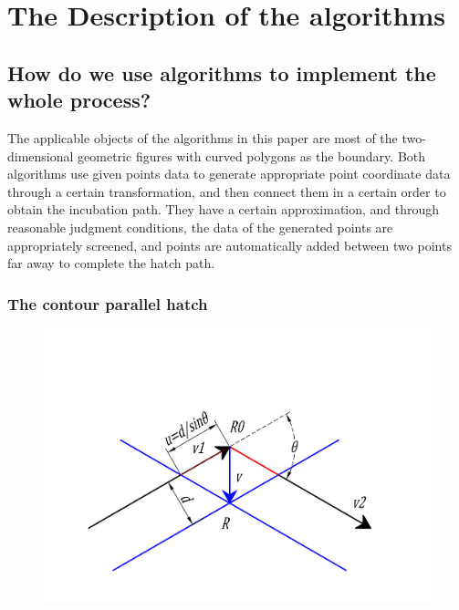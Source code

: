 \documentclass{apmcmthesis}
\begin{document}
\section{The Description of the algorithms}


\subsection{How do we use algorithms to implement the whole process?}

The applicable objects of the algorithms in this paper are most of the two-dimensional geometric figures with curved polygons as the boundary. Both algorithms use given points data to generate appropriate point coordinate data through a certain transformation, and then connect them in a certain order to obtain the incubation path. They have a certain approximation, and through reasonable judgment conditions, the data of the generated points are appropriately screened, and points are automatically added between two points far away to complete the hatch path.



\subsubsection{The contour parallel hatch}

\begin{figure}[!ht]
    \centering
    \includegraphics[width=12cm]{v}
    \caption{}
\end{figure}
\end{document}
